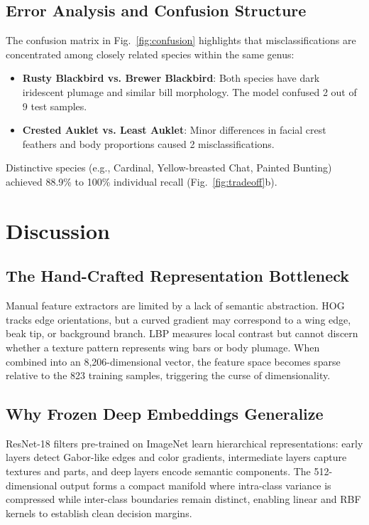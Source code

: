 \documentclass[conference]{IEEEtran}
\begin{document}
\subsection{Error Analysis and Confusion Structure}
The confusion matrix in Fig.~\ref{fig:confusion} highlights that misclassifications are concentrated among closely related species within the same genus:
\begin{itemize}
    \item \textbf{Rusty Blackbird vs. Brewer Blackbird}: Both species have dark iridescent plumage and similar bill morphology. The model confused 2 out of 9 test samples.
    \item \textbf{Crested Auklet vs. Least Auklet}: Minor differences in facial crest feathers and body proportions caused 2 misclassifications.
\end{itemize}
Distinctive species (e.g., Cardinal, Yellow-breasted Chat, Painted Bunting) achieved 88.9\% to 100\% individual recall (Fig.~\ref{fig:tradeoff}b).

\section{Discussion}
\label{sec:discussion}

\subsection{The Hand-Crafted Representation Bottleneck}
Manual feature extractors are limited by a lack of semantic abstraction. HOG tracks edge orientations, but a curved gradient may correspond to a wing edge, beak tip, or background branch. LBP measures local contrast but cannot discern whether a texture pattern represents wing bars or body plumage. When combined into an 8,206-dimensional vector, the feature space becomes sparse relative to the 823 training samples, triggering the curse of dimensionality.

\subsection{Why Frozen Deep Embeddings Generalize}
ResNet-18 filters pre-trained on ImageNet learn hierarchical representations: early layers detect Gabor-like edges and color gradients, intermediate layers capture textures and parts, and deep layers encode semantic components. The 512-dimensional output forms a compact manifold where intra-class variance is compressed while inter-class boundaries remain distinct, enabling linear and RBF kernels to establish clean decision margins.
\end{document}
